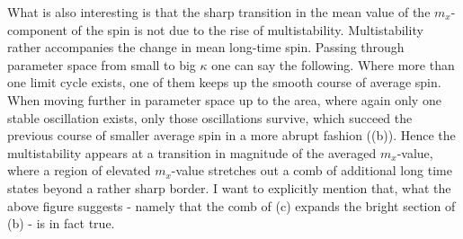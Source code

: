 What is also interesting is that the sharp transition in the mean value of the $m_x$-component of the spin is not due to the rise of multistability. Multistability rather accompanies the change in mean long-time spin. Passing through parameter space from small to big $\kappa$ one can say the following. Where more than one limit cycle exists, one of them keeps up the smooth course of average spin. When moving further in parameter space up to the area, where again only one stable oscillation exists, only those oscillations survive, which succeed the previous course of smaller average spin in a more abrupt fashion ((b)). Hence the multistability appears at a transition in magnitude of the averaged $m_x$-value, where a region of elevated $m_x$-value stretches out a comb of additional long time states beyond a rather sharp border. I want to explicitly mention that, what the above figure suggests - namely that the comb of (c) expands the bright section of (b) - is in  fact true.

